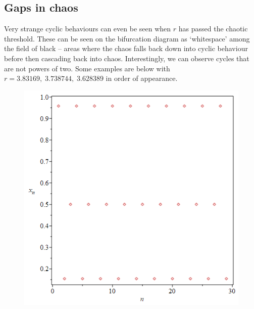 \documentclass[12pt]{article}
\begin{document}
\subsection{Gaps in chaos}
Very strange cyclic behaviours can even be seen when $r$ has passed the chaotic threshold. These can be seen on the bifurcation diagram as `whitespace' among the field of black -- areas where the chaos falls back down into cyclic behaviour before then cascading back into chaos. Interestingly, we can observe cycles that are not powers of two. Some examples are below with $r=3.83169,\;3.738744,\;3.628389$ in order of appearance.
\newpage
\begin{figure}[H]
	\centering
	\hfill
	\begin{minipage}{.45\textwidth}
		\centering
		\includegraphics[scale=0.34]{per3p83169.png}
		\label{fig:test1}
	\end{minipage}%
	\hfill
	\begin{minipage}{.45\textwidth}
		\centering

\end{minipage}
\end{figure}
\end{document}
